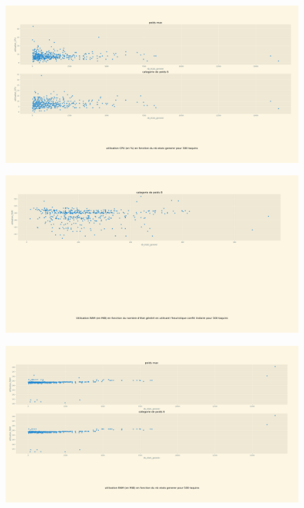 \documentclass[a4paper, 12pt]{article}
\begin{document}
\begin{figure}[H]
    \centering
    \includegraphics[width=\textwidth]{Taquin 3x3 utilisation CPU en fct du nb d'etat generer}
\end{figure}
\begin{figure}[H]
    \centering
    \includegraphics[width=\textwidth]{Taquin 3x3 utilisation RAM en fct du nb d'etat generer conlit lineaire}
\end{figure}
\begin{figure}[H]
    \centering
    \includegraphics[width=\textwidth]{Taquin 3x3 utilisation RAM en fct du nb d'etat generer}
\end{figure}
\end{document}
